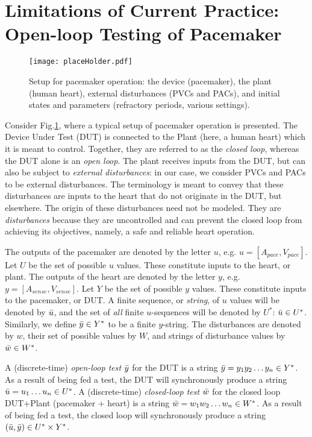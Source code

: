 \section{Limitations of Current Practice: Open-loop Testing of Pacemaker}
\label{todaysPractice}
\begin{figure}[tb]
	\centering
	\texttt{[image: placeHolder.pdf]}
	\caption{Setup for pacemaker operation: the device (pacemaker), the plant (human heart), external disturbances (PVCs and PACs), and initial states and parameters (refractory periods, various settings).}
	\label{fig:liveSetup}
\end{figure}
Consider Fig.\ref{fig:liveSetup}, where a typical setup of pacemaker operation is presented.
The Device Under Test (DUT) is connected to the Plant (here, a human heart) which it is meant to control.
Together, they are referred to as the \emph{closed loop}, whereas the DUT alone is an \emph{open loop}.
The plant receives inputs from the DUT, but can also be subject to \emph{external disturbances}: in our case, we consider PVCs and PACs to be external disturbances.
The terminology is meant to convey that these disturbances are inputs to the heart that do not originate in the DUT, but elsewhere. 
The origin of these disturbances need not be modeled.  
They are \emph{disturbances} because they are uncontrolled and can prevent the closed loop from achieving its objectives, namely, a safe and reliable heart operation.

The outputs of the pacemaker are denoted by the letter $u$, e.g. $u = [A_{pace}, V_{pace}]$.
Let $U$ be the set of possible $u$ values.
These constitute inputs to the heart, or plant.
The outputs of the heart are denoted by the letter $y$, e.g. $y = [A_{sense}, V_{sense}]$.
Let $Y$ be the set of possible $y$ values.
These constitute inputs to the pacemaker, or DUT.
A finite sequence, or \emph{string}, of $u$ values will be denoted by $\bar{u}$, and the set of \emph{all} finite $u$-sequences will be denoted by $U^*$: $\bar{u} \in U^*$.
Similarly, we define $\bar{y} \in Y^*$ to be a finite $y$-string.
The disturbances are denoted by $w$, their set of possible values by $W$, and strings of disturbance values by $\bar{w} \in W^*$.

A (discrete-time) \emph{open-loop test} $\bar{y}$ for the DUT is a string $\bar{y} = y_1 y_2 \ldots y_n \in Y^*$.
As a result of being fed a test, the DUT will synchronously produce a string $\bar{u} = u_1 \ldots u_n \in U^*$.
A (discrete-time) \emph{closed-loop test} $\bar{w}$ for the closed loop DUT+Plant (pacemaker + heart) is a string $\bar{w} = w_1 w_2 \ldots w_n \in W^*$.
As a result of being fed a test, the closed loop will synchronously produce a string $(\bar{u},\bar{y}) \in U^* \times Y^*$.

